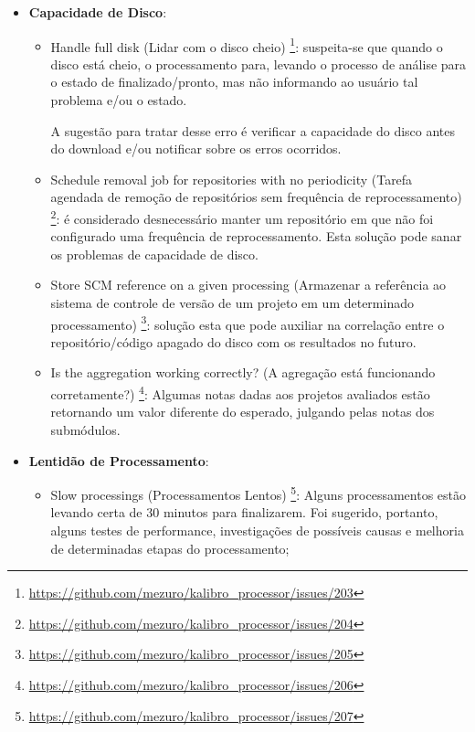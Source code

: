 \begin{itemize}
  \item \textbf{Capacidade de Disco}:
    \begin{itemize}

      \item Handle full disk (Lidar com o disco cheio)
      \footnote{\url{https://github.com/mezuro/kalibro\_processor/issues/203}}:
        suspeita-se que quando o disco está cheio, o processamento para, levando
        o processo de análise para o estado de finalizado/pronto, mas não
        informando ao usuário tal problema e/ou o estado.

        A sugestão para tratar desse erro é verificar a capacidade do
        disco antes do download e/ou notificar sobre os erros ocorridos.

      \item Schedule removal job for repositories with no periodicity (Tarefa
      agendada de remoção de repositórios sem frequência de reprocessamento)
      \footnote{\url{https://github.com/mezuro/kalibro\_processor/issues/204}}:
        é considerado desnecessário manter um repositório em que não foi
        configurado uma frequência de reprocessamento. Esta solução pode sanar
        os problemas de capacidade de disco.

      \item Store SCM reference on a given processing (Armazenar a referência ao
      sistema de controle de versão de um projeto em um determinado
      processamento)
      \footnote{\url{https://github.com/mezuro/kalibro\_processor/issues/205}}:
        solução esta que pode auxiliar na correlação entre o repositório/código
        apagado do disco com os resultados no futuro.

      \item Is the aggregation working correctly? (A agregação está funcionando
      corretamente?)
      \footnote{\url{https://github.com/mezuro/kalibro\_processor/issues/206}}:
        Algumas notas dadas aos projetos avaliados estão retornando um valor
        diferente do esperado, julgando pelas notas dos submódulos.

    \end{itemize}
  \item \textbf{Lentidão de Processamento}:
    \begin{itemize}

      \item Slow processings (Processamentos Lentos)
      \footnote{\url{https://github.com/mezuro/kalibro\_processor/issues/207}}:
        Alguns processamentos estão levando certa de 30 minutos para
        finalizarem. Foi sugerido, portanto, alguns testes de performance,
        investigações de possíveis causas e melhoria de determinadas etapas do
        processamento;


\end{itemize}
\end{itemize}
